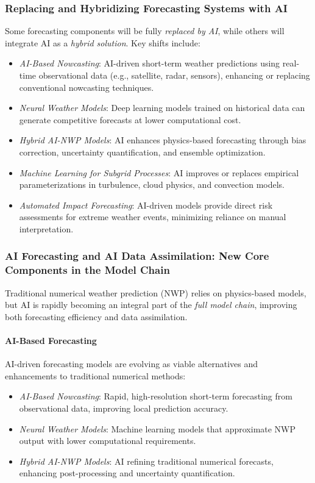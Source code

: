 \subsubsection{Replacing and Hybridizing Forecasting Systems with AI}
Some forecasting components will be fully \emph{replaced by AI}, while others will integrate AI as a \emph{hybrid solution}. Key shifts include:
\begin{itemize}[itemsep=1pt,topsep=3pt]
    \item \emph{AI-Based Nowcasting}: AI-driven short-term weather predictions using real-time observational data (e.g., satellite, radar, sensors), enhancing or replacing conventional nowcasting techniques.
    \item \emph{Neural Weather Models}: Deep learning models trained on historical data can generate competitive forecasts at lower computational cost.
    \item \emph{Hybrid AI-NWP Models}: AI enhances physics-based forecasting through bias correction, uncertainty quantification, and ensemble optimization.
    \item \emph{Machine Learning for Subgrid Processes}: AI improves or replaces empirical parameterizations in turbulence, cloud physics, and convection models.
    \item \emph{Automated Impact Forecasting}: AI-driven models provide direct risk assessments for extreme weather events, minimizing reliance on manual interpretation.
\end{itemize}

\subsubsection{AI Forecasting and AI Data Assimilation: New Core Components in the Model Chain}

Traditional numerical weather prediction (NWP) relies on physics-based models, but AI is rapidly becoming an integral part of the \emph{full model chain}, improving both forecasting efficiency and data assimilation.

\paragraph{AI-Based Forecasting}
AI-driven forecasting models are evolving as viable alternatives and enhancements to traditional numerical methods:
\begin{itemize}[itemsep=1pt,topsep=3pt]
    \item \emph{AI-Based Nowcasting}: Rapid, high-resolution short-term forecasting from observational data, improving local prediction accuracy.
    \item \emph{Neural Weather Models}: Machine learning models that approximate NWP output with lower computational requirements.
    \item \emph{Hybrid AI-NWP Models}: AI refining traditional numerical forecasts, enhancing post-processing and uncertainty quantification.
\end{itemize}

